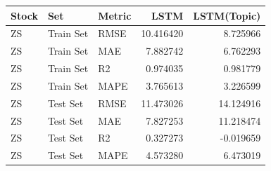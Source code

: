 \begin{tabular}{lllrr}
\toprule
Stock & Set & Metric & LSTM & LSTM(Topic) \\
\midrule
ZS & Train Set & RMSE & 10.416420 & 8.725966 \\
ZS & Train Set & MAE & 7.882742 & 6.762293 \\
ZS & Train Set & R2 & 0.974035 & 0.981779 \\
ZS & Train Set & MAPE & 3.765613 & 3.226599 \\
ZS & Test Set & RMSE & 11.473026 & 14.124916 \\
ZS & Test Set & MAE & 7.827253 & 11.218474 \\
ZS & Test Set & R2 & 0.327273 & -0.019659 \\
ZS & Test Set & MAPE & 4.573280 & 6.473019 \\
\bottomrule
\end{tabular}

